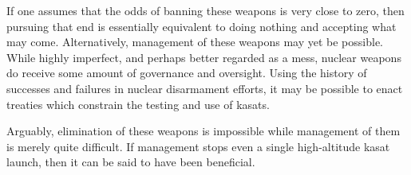 If one assumes that the odds of banning these weapons is very close to
zero, then pursuing that end is essentially equivalent to doing
nothing and accepting what may come.  Alternatively, management of
these weapons may yet be possible.  While highly imperfect, and
perhaps better regarded as a mess, nuclear weapons do receive some
amount of governance and oversight.  Using the history of successes
and failures in nuclear disarmament efforts, it may be possible to
enact treaties which constrain the testing and use of \acp{kasat}.

Arguably, elimination of these weapons is impossible while management
of them is merely quite difficult.  If management stops even a single
high-altitude \ac{kasat} launch, then it can be said to have been
beneficial.
